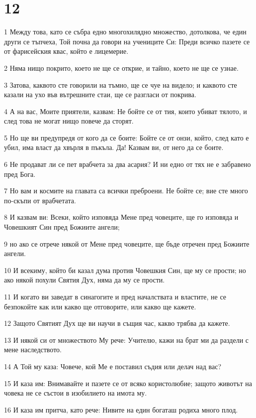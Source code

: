 \chapter{12}

\par 1 Между това, като се събра едно многохилядно множество, дотолкова, че един други се тъпчеха, Той почна да говори на учениците Си: Преди всичко пазете се от фарисейския квас, който е лицемерие.
\par 2 Няма нищо покрито, което не ще се открие, и тайно, което не ще се узнае.
\par 3 Затова, каквото сте говорили на тъмно, ще се чуе на видело; и каквото сте казали на ухо във вътрешните стаи, ще се разгласи от покрива.
\par 4 А на вас, Моите приятели, казвам: Не бойте се от тия, които убиват тялото, и след това не могат нищо повече да сторят.
\par 5 Но ще ви предупредя от кого да се боите: Бойте се от онзи, който, след като е убил, има власт да хвърля в пъкъла. Да! Казвам ви, от него да се боите.
\par 6 Не продават ли се пет врабчета за два асария? И ни едно от тях не е забравено пред Бога.
\par 7 Но вам и космите на главата са всички преброени. Не бойте се; вие сте много по-скъпи от врабчетата.
\par 8 И казвам ви: Всеки, който изповяда Мене пред човеците, ще го изповяда и Човешкият Син пред Божиите ангели;
\par 9 но ако се отрече някой от Мене пред човеците, ще бъде отречен пред Божиите ангели.
\par 10 И всекиму, който би казал дума против Човешкия Син, ще му се прости; но ако някой похули Святия Дух, няма да му се прости.
\par 11 И когато ви заведат в синагогите и пред началствата и властите, не се безпокойте как или какво ще отговорите, или какво ще кажете.
\par 12 Защото Святият Дух ще ви научи в същия час, какво трябва да кажете.
\par 13 И някой си от множеството Му рече: Учителю, кажи на брат ми да раздели с мене наследството.
\par 14 А Той му каза: Човече, кой Ме е поставил съдия или делач над вас?
\par 15 И каза им: Внимавайте и пазете се от всяко користолюбие; защото животът на човека не се състои в изобилието на имота му.
\par 16 И каза им притча, като рече: Нивите на един богаташ родиха много плод.
